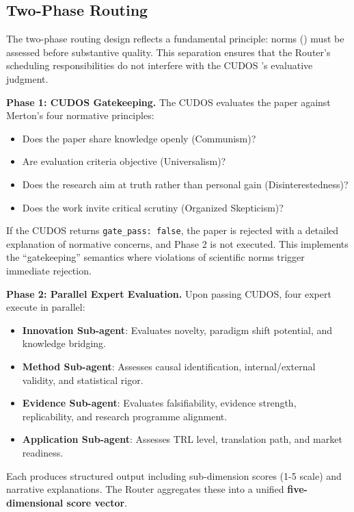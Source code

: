 \subsection{Two-Phase Routing}

The two-phase routing design reflects a fundamental principle: norms (\cudos{}) must be assessed before substantive quality. This separation ensures that the Router's scheduling responsibilities do not interfere with the CUDOS \subagent{}'s evaluative judgment.

\textbf{Phase 1: CUDOS Gatekeeping.} The CUDOS \subagent{} evaluates the paper against Merton's four normative principles:
\begin{itemize}
    \item Does the paper share knowledge openly (Communism)?
    \item Are evaluation criteria objective (Universalism)?
    \item Does the research aim at truth rather than personal gain (Disinterestedness)?
    \item Does the work invite critical scrutiny (Organized Skepticism)?
\end{itemize}
If the CUDOS \subagent{} returns \texttt{gate\_pass: false}, the paper is rejected with a detailed explanation of normative concerns, and Phase 2 is not executed. This implements the ``gatekeeping'' semantics where violations of scientific norms trigger immediate rejection.

\textbf{Phase 2: Parallel Expert Evaluation.} Upon passing CUDOS, four expert \subagents{} execute in parallel:
\begin{itemize}
    \item \textbf{Innovation Sub-agent}: Evaluates novelty, paradigm shift potential, and knowledge bridging.
    \item \textbf{Method Sub-agent}: Assesses causal identification, internal/external validity, and statistical rigor.
    \item \textbf{Evidence Sub-agent}: Evaluates falsifiability, evidence strength, replicability, and research programme alignment.
    \item \textbf{Application Sub-agent}: Assesses TRL level, translation path, and market readiness.
\end{itemize}

Each \subagent{} produces structured output including sub-dimension scores (1-5 scale) and narrative explanations. The Router aggregates these into a unified \textbf{five-dimensional score vector}.

